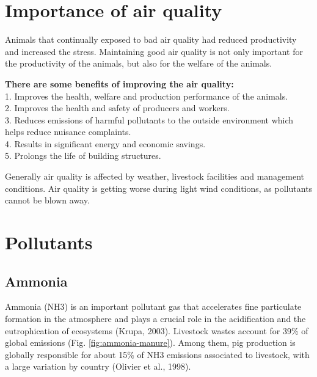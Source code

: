 \documentclass[]{book}
\begin{document}
\section{Importance of air quality}\label{importance-of-air-quality}

Animals that continually exposed to bad air quality had reduced
productivity and increased the stress. Maintaining good air quality is
not only important for the productivity of the animals, but also for the
welfare of the animals.

\textbf{There are some benefits of improving the air quality:}\\
1. Improves the health, welfare and production performance of the
animals.\\
2. Improves the health and safety of producers and workers.\\
3. Reduces emissions of harmful pollutants to the outside environment
which helps reduce nuisance complaints.\\
4. Results in significant energy and economic savings.\\
5. Prolongs the life of building structures.

Generally air quality is affected by weather, livestock facilities and
management conditions. Air quality is getting worse during light wind
conditions, as pollutants cannot be blown away.

\section{Pollutants}\label{pollutants}

\subsection{Ammonia}\label{ammonia}

Ammonia (NH3) is an important pollutant gas that accelerates fine
particulate formation in the atmosphere and plays a crucial role in the
acidification and the eutrophication of ecosystems (Krupa, 2003).
Livestock wastes account for 39\% of global emissions (Fig.
\ref{fig:ammonia-manure}). Among them, pig production is globally
responsible for about 15\% of NH3 emissions associated to livestock,
with a large variation by country (Olivier et al., 1998).
\end{document}
